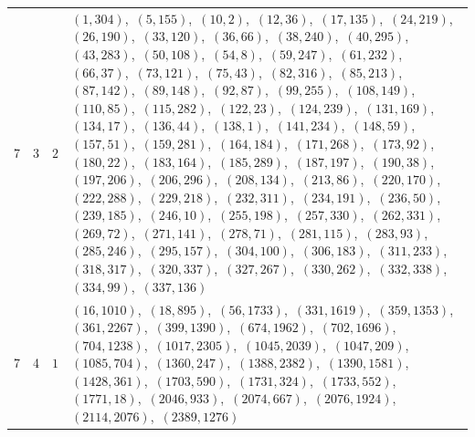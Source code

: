 \documentclass[11pt]{article}
\begin{document}
{\begin{longtable}{@{}rrl>{\raggedright\arraybackslash}p{}@{}}
7 & 3 & $2$ & $(1,304)$,\allowbreak\ $(5,155)$,\allowbreak\ $(10,2)$,\allowbreak\ $(12,36)$,\allowbreak\ $(17,135)$,\allowbreak\ $(24,219)$,\allowbreak\ $(26,190)$,\allowbreak\ $(33,120)$,\allowbreak\ $(36,66)$,\allowbreak\ $(38,240)$,\allowbreak\ $(40,295)$,\allowbreak\ $(43,283)$,\allowbreak\ $(50,108)$,\allowbreak\ $(54,8)$,\allowbreak\ $(59,247)$,\allowbreak\ $(61,232)$,\allowbreak\ $(66,37)$,\allowbreak\ $(73,121)$,\allowbreak\ $(75,43)$,\allowbreak\ $(82,316)$,\allowbreak\ $(85,213)$,\allowbreak\ $(87,142)$,\allowbreak\ $(89,148)$,\allowbreak\ $(92,87)$,\allowbreak\ $(99,255)$,\allowbreak\ $(108,149)$,\allowbreak\ $(110,85)$,\allowbreak\ $(115,282)$,\allowbreak\ $(122,23)$,\allowbreak\ $(124,239)$,\allowbreak\ $(131,169)$,\allowbreak\ $(134,17)$,\allowbreak\ $(136,44)$,\allowbreak\ $(138,1)$,\allowbreak\ $(141,234)$,\allowbreak\ $(148,59)$,\allowbreak\ $(157,51)$,\allowbreak\ $(159,281)$,\allowbreak\ $(164,184)$,\allowbreak\ $(171,268)$,\allowbreak\ $(173,92)$,\allowbreak\ $(180,22)$,\allowbreak\ $(183,164)$,\allowbreak\ $(185,289)$,\allowbreak\ $(187,197)$,\allowbreak\ $(190,38)$,\allowbreak\ $(197,206)$,\allowbreak\ $(206,296)$,\allowbreak\ $(208,134)$,\allowbreak\ $(213,86)$,\allowbreak\ $(220,170)$,\allowbreak\ $(222,288)$,\allowbreak\ $(229,218)$,\allowbreak\ $(232,311)$,\allowbreak\ $(234,191)$,\allowbreak\ $(236,50)$,\allowbreak\ $(239,185)$,\allowbreak\ $(246,10)$,\allowbreak\ $(255,198)$,\allowbreak\ $(257,330)$,\allowbreak\ $(262,331)$,\allowbreak\ $(269,72)$,\allowbreak\ $(271,141)$,\allowbreak\ $(278,71)$,\allowbreak\ $(281,115)$,\allowbreak\ $(283,93)$,\allowbreak\ $(285,246)$,\allowbreak\ $(295,157)$,\allowbreak\ $(304,100)$,\allowbreak\ $(306,183)$,\allowbreak\ $(311,233)$,\allowbreak\ $(318,317)$,\allowbreak\ $(320,337)$,\allowbreak\ $(327,267)$,\allowbreak\ $(330,262)$,\allowbreak\ $(332,338)$,\allowbreak\ $(334,99)$,\allowbreak\ $(337,136)$\\
7 & 4 & $1$ & $(16,1010)$,\allowbreak\ $(18,895)$,\allowbreak\ $(56,1733)$,\allowbreak\ $(331,1619)$,\allowbreak\ $(359,1353)$,\allowbreak\ $(361,2267)$,\allowbreak\ $(399,1390)$,\allowbreak\ $(674,1962)$,\allowbreak\ $(702,1696)$,\allowbreak\ $(704,1238)$,\allowbreak\ $(1017,2305)$,\allowbreak\ $(1045,2039)$,\allowbreak\ $(1047,209)$,\allowbreak\ $(1085,704)$,\allowbreak\ $(1360,247)$,\allowbreak\ $(1388,2382)$,\allowbreak\ $(1390,1581)$,\allowbreak\ $(1428,361)$,\allowbreak\ $(1703,590)$,\allowbreak\ $(1731,324)$,\allowbreak\ $(1733,552)$,\allowbreak\ $(1771,18)$,\allowbreak\ $(2046,933)$,\allowbreak\ $(2074,667)$,\allowbreak\ $(2076,1924)$,\allowbreak\ $(2114,2076)$,\allowbreak\ $(2389,1276)$\\

\end{longtable}}
\end{document}
